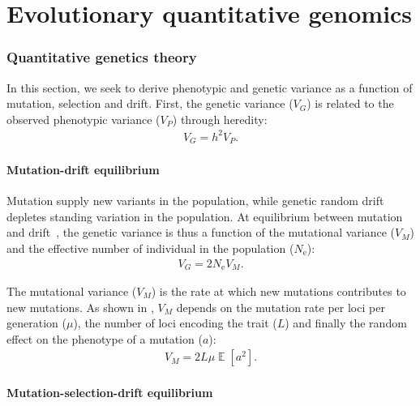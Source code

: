 \documentclass{article}
\DeclareMathOperator{\E}{\mathbb{E}}
\newcommand{\Ne}{N_{\text{e}}}
\newcommand{\VarPhenotype}{V_{P}}
\newcommand{\VarGenetic}{V_{G}}
\newcommand{\VarMutation}{V_{M}}
\newcommand{\MutationRate}{\mu}
\newcommand{\NbrLoci}{L}
\begin{document}
\part*{Evolutionary quantitative genomics}
\tableofcontents

\section{Quantitative genetics theory}

In this section, we seek to derive phenotypic and genetic variance as a function of mutation, selection and drift.
First, the genetic variance ($\VarGenetic$) is related to the observed phenotypic variance ($\VarPhenotype$) through heredity:
\begin{gather}
    \VarGenetic =  h^2 \VarPhenotype \label{eq-heredity}.
\end{gather}

\subsection{Mutation-drift equilibrium}

Mutation supply new variants in the population, while genetic random drift depletes standing variation in the population. At equilibrium between mutation and drift~\citep{lynch_mutation_1998}, the genetic variance is thus a function of the mutational variance ($\VarMutation$) and the effective number of individual in the population ($\Ne$):
\begin{gather}
    \VarGenetic =  2 \Ne \VarMutation \label{eq-var-genetic}.
\end{gather}

The mutational variance ($\VarMutation$) is the rate at which new mutations contributes to new mutations. As shown in \citet{lande_quantitative_1979, lande_sexual_1980}, $\VarMutation$ depends on the mutation rate per loci per generation ($\MutationRate$), the number of loci encoding the trait ($\NbrLoci$) and finally the random effect on the phenotype of a mutation ($a$):
\begin{gather}
    \VarMutation =  2 \NbrLoci \MutationRate \E \left[ a^2 \right] \label{eq-var-mutation}.
\end{gather}

\subsection{Mutation-selection-drift equilibrium}
\end{document}
